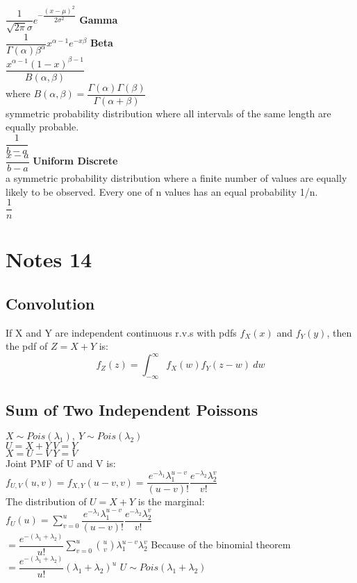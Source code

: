 \documentclass{article}
\begin{document}
\begin{flushleft}
$\dfrac{1}{\sqrt{2\pi}\sigma}e^{-\dfrac{(x-\mu)^2}{2\sigma^2}}$\medbreak
\textbf{Gamma}\\
$\dfrac{1}{\Gamma(\alpha)\beta^\alpha}x^{\alpha-1}e^{-x\beta}$\medbreak
\textbf{Beta}\\
$\dfrac{x^{\alpha-1}(1-x)^{\beta-1}}{B(\alpha,\beta)}$\\
where $B(\alpha,\beta)=\dfrac{\Gamma(\alpha)\Gamma(\beta)}{\Gamma(\alpha+\beta)}$ \medbreak
{}\\
symmetric probability distribution where all intervals of the same length are equally probable.\\
$\dfrac{1}{b-a}$\\
$\dfrac{x-a}{b-a}$\medbreak
\textbf{Uniform Discrete}\\
a symmetric probability distribution where a finite number of values are equally likely to be observed. Every one of n values has an equal probability 1/n.\\
$\dfrac{1}{n}$\medbreak
\section*{Notes 14}
\subsection*{Convolution}
If X and Y are independent continuous r.v.s with pdfs $f_X(x)$ and $f_Y(y)$, then the pdf of $Z=X+Y$ is:
\[f_Z(z)=\int_{-\infty}^{\infty}f_X(w)f_Y(z-w)\ dw
\]
\subsection*{Sum of Two Independent Poissons}
$X\sim Pois(\lambda_1), \ Y\sim Pois(\lambda_2)$\\
$U=X+Y \ V=Y$\\
$X=U-V \ Y=V$\\
Joint PMF of U and V is:\\
$f_{U,V}(u,v)=f_{X,Y}(u-v,v)=\dfrac{e^{-\lambda_1}\lambda_1^{u-v}}{(u-v)!}\dfrac{e^{-\lambda_2}\lambda_2^v}{v!}$\\
The distribution of $U=X+Y$ is the marginal:\\
$f_U(u)=\sum_{v=0}^{u}\dfrac{e^{-\lambda_1}\lambda_1^{u-v}}{(u-v)!}\dfrac{e^{-\lambda_2}\lambda_2^v}{v!}$\\
$=\dfrac{e^{-(\lambda_1+\lambda_2)}}{u!}\sum_{v=0}^{u} {u \choose v}\lambda_1^{u-v}\lambda_2^v$\medbreak
Because of the binomial theorem\medbreak
$=\dfrac{e^{-(\lambda_1+\lambda_2)}}{u!}(\lambda_1+\lambda_2)^u$\medbreak
$U\sim Pois(\lambda_1+\lambda_2)$

\end{flushleft}
\end{document}

